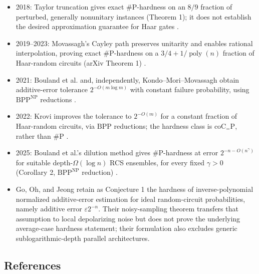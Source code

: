 \begin{itemize}
  \item 2018: Taylor truncation gives exact $\#\mathrm{P}$-hardness on an $8/9$
fraction of perturbed, generally nonunitary instances (Theorem 1);
it does not establish the desired approximation guarantee for Haar gates
.

  \item 2019--2023: Movassagh's Cayley path preserves unitarity and enables rational
interpolation, proving exact $\#\mathrm{P}$-hardness on a
$3/4+1/\operatorname{poly}(n)$ fraction of Haar-random circuits
(arXiv Theorem 1) .

  \item 2021: Bouland et al. and, independently, Kondo--Mori--Movassagh obtain
additive-error tolerance $2^{-O(m\log m)}$ with constant failure probability,
using $\mathrm{BPP}^{\mathrm{NP}}$ reductions
.

  \item 2022: Krovi improves the tolerance to $2^{-O(m)}$ for a constant fraction
of Haar-random circuits, via $\mathrm{BPP}$ reductions; the hardness class
is $\mathrm{coC}_{=}\mathrm{P}$, rather than $\#\mathrm{P}$
.

  \item 2025: Bouland et al.'s dilution method gives $\#\mathrm{P}$-hardness at
error $2^{-n-O(n^\gamma)}$ for suitable depth-$\Omega(\log n)$ RCS ensembles,
for every fixed $\gamma>0$ (Corollary 2, $\mathrm{BPP}^{\mathrm{NP}}$ reduction)
.

  \item Go, Oh, and Jeong retain as Conjecture 1 the hardness of inverse-polynomial normalized additive-error estimation for ideal random-circuit probabilities, namely additive error $\varepsilon 2^{-n}$. Their noisy-sampling theorem transfers that assumption to local depolarizing noise but does not prove the underlying average-case hardness statement; their formulation also excludes generic sublogarithmic-depth parallel architectures. 
\end{itemize}

\subsection*{References}

